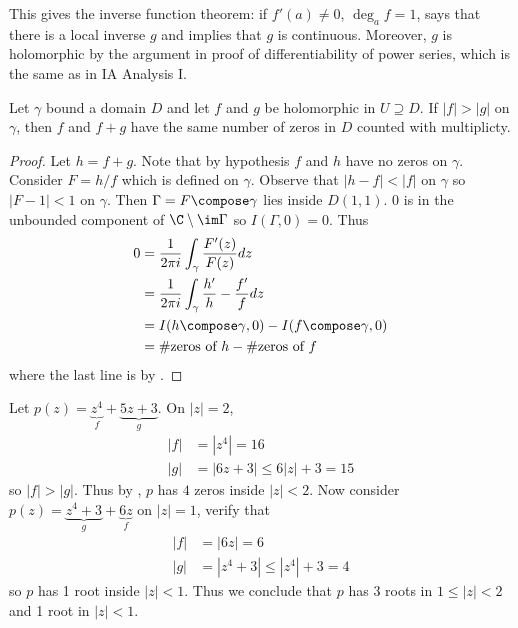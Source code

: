 \documentclass[a4paper]{article}
\begin{document}
\begin{remark}
  This gives the inverse function theorem: if \(f'(a) \neq 0\), \(\deg_a f = 1\),  says that there is a local inverse \(g\) and  implies that \(g\) is continuous. Moreover, \(g\) is holomorphic by the argument in proof of differentiability of power series, which is the same as in IA Analysis I.
\end{remark}

\begin{theorem}[Rouché]
  \label{thm:Rouche}
  Let \(\gamma\) bound a domain \(D\) and let \(f\) and \(g\) be holomorphic in \(U \supseteq D\). If \(|f| > |g|\) on \(\gamma\), then \(f\) and \(f + g\) have the same number of zeros in \(D\) counted with multiplicty.
\end{theorem}

\begin{proof}
  Let \(h = f + g\). Note that by hypothesis \(f\) and \(h\) have no zeros on \(\gamma\). Consider \(F = h/f\) which is defined on \(\gamma\). Observe that \(|h - f| < |f|\) on \(\gamma\) so \(|F - 1| < 1\) on \(\gamma\). Then \(\Gamma = F \compose \gamma\) lies inside \(D(1, 1)\). \(0\) is in the unbounded component of \(\C \setminus \im \Gamma\) so \(I(\Gamma, 0) = 0\). Thus
  \begin{align*}
    0
    &= \frac{1}{2\pi i} \int_\gamma \frac{F'(z)}{F(z)} dz \\
    &= \frac{1}{2\pi i} \int_\gamma \frac{h'}{h} - \frac{f'}{f} dz \\
    &= I(h \compose \gamma, 0) - I(f \compose \gamma, 0) \\
    &= \#\text{zeros of } h - \#\text{zeros of } f
  \end{align*}
  where the last line is by .
\end{proof}

\begin{eg}
  Let \(p(z) = \underbrace{z^4}_f + \underbrace{5z + 3}_g\). On \(|z| = 2\),
  \begin{align*}
    |f| &= |z^4| = 16 \\
    |g| &= |6z + 3| \leq 6|z| + 3 = 15
  \end{align*}
  so \(|f| > |g|\). Thus by , \(p\) has \(4\) zeros inside \(|z| < 2\). Now consider \(p(z) = \underbrace{z^4 + 3}_g + \underbrace{6z}_f\) on \(|z| = 1\), verify that
  \begin{align*}
    |f| &= |6z| = 6 \\
    |g| &= |z^4 + 3| \leq |z^4| + 3 = 4
  \end{align*}
  so \(p\) has 1 root inside \(|z| < 1\). Thus we conclude that \(p\) has 3 roots in \(1 \leq |z| < 2\) and 1 root in \(|z| < 1\).
\end{eg}

\printindex

\iffalse
past lecture notes:
T. Scholl, K. Carne

Book
Ahlfors, Complex Analysis
\fi
\end{document}
